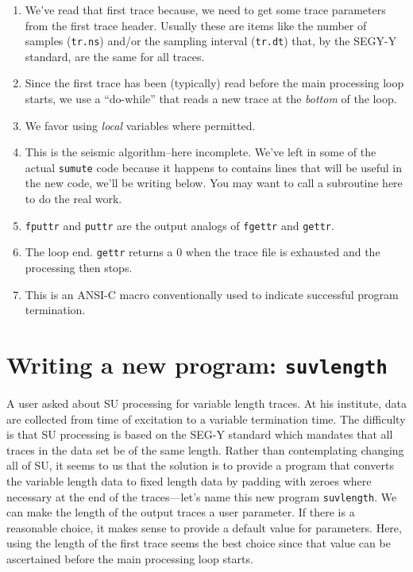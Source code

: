 {{{{{{{\begin{enumerate}
called {\tt tr}), therefore we will have to process this trace before the next 
call to {\tt fgettr}.
\item We've read that first trace because, we need to get some trace parameters from the 
first trace header.  Usually these are items like the number of samples ({\tt tr.ns}) 
and/or the sampling interval ({\tt tr.dt}) that, by the {\sf SEGY-Y} standard, are the 
same for all traces.
\item Since the first trace has been (typically) read before the main processing loop starts, we use a ``do-while'' that reads a new trace at the {\em bottom} of the loop.
\item We favor using {\em local} variables where permitted.
\item This is the seismic algorithm--here incomplete.  We've left in some of the actual {\tt sumute} code because it happens to contains lines that will be useful in the new code, we'll be writing below.  You may want to call a subroutine here to do the real work.
\item {\tt fputtr} and {\tt puttr} are the output analogs of {\tt fgettr} and {\tt gettr}.
\item The loop end.  {\tt gettr} returns a 0 when the trace file is exhausted and the processing then stops.
\item This is an {\sf ANSI-C} macro conventionally used to indicate successful program termination.
\end{enumerate}

\section{Writing a new program: {\tt suvlength}}

A user asked about {\small\sf SU} processing for variable length traces.  At his
institute, data are collected from time of excitation to a variable
termination time.  The difficulty is that {\small\sf SU} processing is based on
the {\sf SEG-Y} standard which mandates that all traces in the data set
be of the same length.  Rather than contemplating changing all of {\small\sf SU},
it seems to us that the solution is to provide a program that converts
the variable length data to fixed length data by padding with zeroes
where necessary at the end of the traces---let's name this new program
{\tt suvlength}.  We can make the length of the output traces a user
parameter.  If there is a reasonable choice, it makes sense to provide
a default value for parameters.  Here, using the length of the first
trace seems the best choice since that value can be ascertained before
the main processing loop starts.

}}}}}}}
